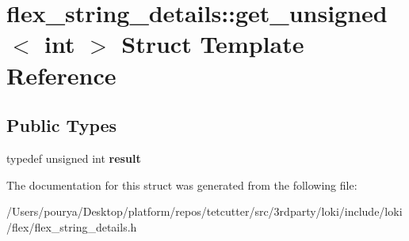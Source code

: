 \hypertarget{structflex__string__details_1_1get__unsigned_3_01int_01_4}{}\section{flex\+\_\+string\+\_\+details\+:\+:get\+\_\+unsigned$<$ int $>$ Struct Template Reference}
\label{structflex__string__details_1_1get__unsigned_3_01int_01_4}
\subsection*{Public Types}
\begin{DoxyCompactItemize}
\item 
\hypertarget{structflex__string__details_1_1get__unsigned_3_01int_01_4_aba0b93da9b1c2e80f616374e67f45a63}{}typedef unsigned int {\bfseries result}\label{structflex__string__details_1_1get__unsigned_3_01int_01_4_aba0b93da9b1c2e80f616374e67f45a63}

\end{DoxyCompactItemize}


The documentation for this struct was generated from the following file\+:\begin{DoxyCompactItemize}
\item 
/\+Users/pourya/\+Desktop/platform/repos/tetcutter/src/3rdparty/loki/include/loki/flex/flex\+\_\+string\+\_\+details.\+h\end{DoxyCompactItemize}
